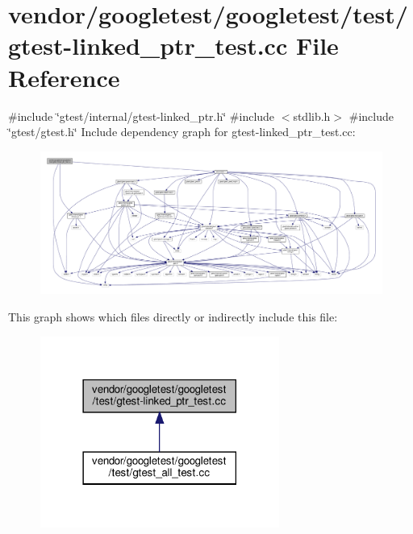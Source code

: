 \hypertarget{gtest-linked__ptr__test_8cc}{}\section{vendor/googletest/googletest/test/gtest-\/linked\+\_\+ptr\+\_\+test.cc File Reference}
\label{gtest-linked__ptr__test_8cc}
{\ttfamily \#include \char`\"{}gtest/internal/gtest-\/linked\+\_\+ptr.\+h\char`\"{}}\newline
{\ttfamily \#include $<$stdlib.\+h$>$}\newline
{\ttfamily \#include \char`\"{}gtest/gtest.\+h\char`\"{}}\newline
Include dependency graph for gtest-\/linked\+\_\+ptr\+\_\+test.cc\+:
\nopagebreak
\begin{figure}[H]
\begin{center}
\leavevmode
\includegraphics[width=350pt]{gtest-linked__ptr__test_8cc__incl}
\end{center}
\end{figure}
This graph shows which files directly or indirectly include this file\+:
\nopagebreak
\begin{figure}[H]
\begin{center}
\leavevmode
\includegraphics[width=222pt]{gtest-linked__ptr__test_8cc__dep__incl}
\end{center}
\end{figure}
